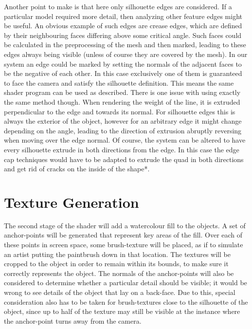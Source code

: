 \documentclass[a4paper, 12pt]{article}
\begin{document}
Another point to make is that here only silhouette edges are considered. If a particular model required more detail, then analyzing other feature edges might be useful. An obvious example of such edges are crease edges, which are defined by their neighbouring faces differing above some critical angle. Such faces could be calculated in the preprocessing of the mesh and then marked, leading to these edges always being visible (unless of course they are covered by the mesh). In our system an edge could be marked by setting the normals of the adjacent faces to be the negative of each other. In this case exclusively one of them is guaranteed to face the camera and satisfy the silhouette definition. This means the same shader program can be used as described. There is one issue with using exactly the same method though. When rendering the weight of the line, it is extruded perpendicular to the edge and towards its normal. For silhouette edges this is always the exterior of the object, however for an arbitrary edge it might change depending on the angle, leading to the direction of extrusion abruptly reversing when moving over the edge normal. Of course, the system can be altered to have every silhouette extrude in both directions from the edge. In this case the edge cap techniques would have to be adapted to extrude the quad in both directions and get rid of cracks on the inside of the shape*.



\section{Texture Generation}

The second stage of the shader will add a watercolour fill to the objects. A set of anchor-points will be generated that represent key areas of the fill. Over each of these points in screen space, some brush-texture will be placed, as if to simulate an artist putting the paintbrush down in that location. The textures will be cropped to the object in order to remain within its bounds, to make sure it correctly represents the object. The normals of the anchor-points will also be considered to determine whether a particular detail should be visible; it would be wrong to see details of the object that lay on a back-face. Due to this, special consideration also has to be taken for brush-textures close to the silhouette of the object, since up to half of the texture may still be visible at the instance where the anchor-point turns away from the camera.
\end{document}
